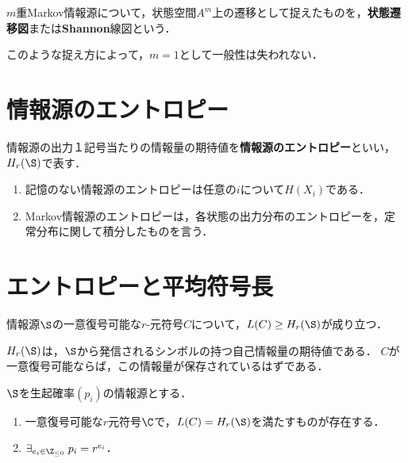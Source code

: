 \documentclass[uplatex,dvipdfmx]{jsreport}
\begin{document}
\begin{definition}
    $m$重Markov情報源について，状態空間$A^m$上の遷移として捉えたものを，\textbf{状態遷移図}または\textbf{Shannon}線図という．
\end{definition}
\begin{remarks}
    このような捉え方によって，$m=1$として一般性は失われない．
\end{remarks}

\section{情報源のエントロピー}

\begin{definition}
    情報源の出力１記号当たりの情報量の期待値を\textbf{情報源のエントロピー}といい，$H_r(\S)$で表す．
\end{definition}
\begin{example}\mbox{}
    \begin{enumerate}
        \item 記憶のない情報源のエントロピーは任意の$i$について$H(X_i)$である．
        \item Markov情報源のエントロピーは，各状態の出力分布のエントロピーを，定常分布に関して積分したものを言う．
    \end{enumerate}
\end{example}

\section{エントロピーと平均符号長}

\begin{theorem}
    情報源$\S$の一意復号可能な$r$-元符号$C$について，$L(C)\ge H_r(\S)$が成り立つ．
\end{theorem}
\begin{remarks}
    $H_r(\S)$は，$\S$から発信されるシンボルの持つ自己情報量の期待値である．
    $C$が一意復号可能ならば，この情報量が保存されているはずである．
\end{remarks}

\begin{corollary}
    $\S$を生起確率$(p_i)$の情報源とする．
    \begin{enumerate}
        \item 一意復号可能な$r$元符号$\C$で，$L(C)=H_r(\S)$を満たすものが存在する．
        \item $\exists_{e_i\in\Z_{\le0}}\;p_i=r^{e_i}$．
    \end{enumerate}
\end{corollary}
\end{document}
